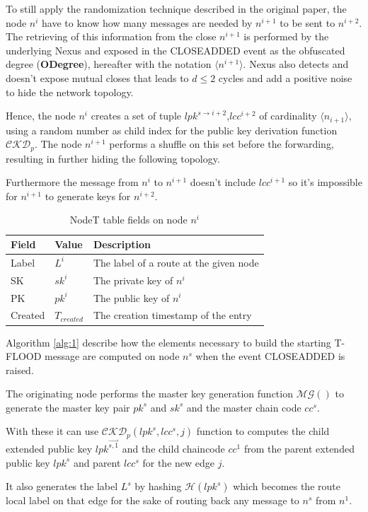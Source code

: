 \documentclass[12pt,oneside]{wlscirep}
\DeclareRobustCommand{\odegree}[1]{{\langle{#1}\rangle}}
\DeclareRobustCommand{\kder}[1]{{\overrightarrow{{#1}}}}
\begin{document}
To still apply the randomization technique described in the original paper, the node $n^i$ have to know how many messages are needed by $n^{i+1}$ to be sent to $n^{i+2}$. The retrieving of this information from the close $n^{i+1}$ is performed by the underlying Nexus and exposed in the CLOSEADDED event as the obfuscated degree (\textbf{ODegree}), hereafter with the notation $\odegree{n^{i+1}}$. Nexus also detects and doesn't expose mutual closes that leads to $d\leq 2$ cycles and add a positive noise to hide the network topology. \par
Hence, the node $n^i$ creates a set of tuple $lpk^{s \to i+2}$,$lcc^{i+2}$ of cardinality $\odegree{n_{i+1}}$, using a random number as child index for the public key derivation function $\mathcal{CKD}_p$. 
The node $n^{i+1}$ performs a shuffle on this set before the forwarding, resulting in further hiding the following topology.\par 
Furthermore the message from $n^i$ to $n^{i+1}$ doesn't include $lcc^{i+1}$ so it's impossible for $n^{i+1}$ to generate keys for $n^{i+2}$. \par



\begin{table}[ht]
\begin{tabularx}{\textwidth}{llX}
\toprule
Field     & Value &  Description                          \\ \midrule
Label & $L^i$ & The label of a route at the given node \\
SK & $sk^i$ & The private key of $n^i$  \\
PK & $pk^i$ & The public key of $n^i$  \\
Created    & $T_{created}$ & The creation timestamp of the entry    \\ \bottomrule
\end{tabularx}
\caption{NodeT table fields on node $n^i$}
\label{NodeT}
\end{table}

\newpage
Algorithm \ref{alg:1} describe how the elements necessary to build the starting T-FLOOD message are computed on node $n^s$ when the event CLOSEADDED is raised. \par
The originating node performs the master key generation function $\mathcal{MG}()$ to generate the master key pair $pk^s$ and $sk^s$ and the master chain code $cc^s$.\par 
With these it can use $\mathcal{CKD}_p(lpk^s, lcc^s, j)$ function to computes the child extended public key $lpk^\kder{s, 1}$ and the child chaincode $cc^1$ from the parent extended public key $lpk^s$ and parent $lcc^s$ for the new edge $j$.\par
It also generates the label $L^s$ by hashing $\mathcal{H}(lpk^s)$ which becomes the route local label on that edge for the sake of routing back any message to $n^s$ from $n^1$.\par
\end{document}
